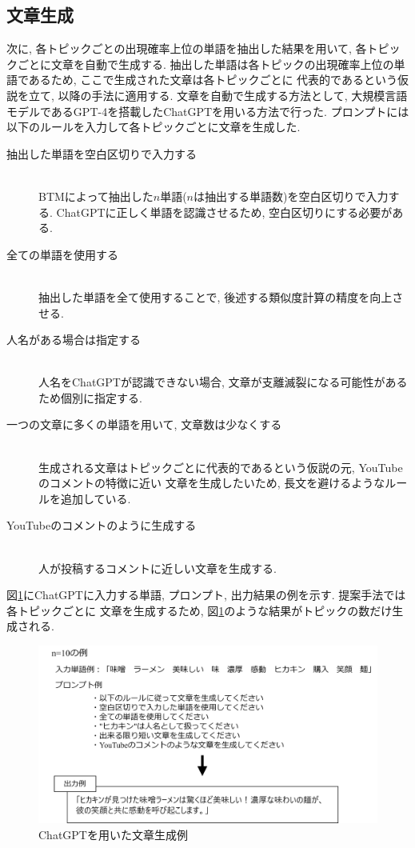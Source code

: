 \documentclass{ltjarticle}
\begin{document}
\subsection{文章生成}
次に, 各トピックごとの出現確率上位の単語を抽出した結果を用いて, 各トピックごとに文章を自動で生成する. 
抽出した単語は各トピックの出現確率上位の単語であるため, ここで生成された文章は各トピックごとに
代表的であるという仮説を立て, 以降の手法に適用する. 
文章を自動で生成する方法として, 大規模言語モデルであるGPT-4を搭載したChatGPTを用いる方法で行った. 
プロンプトには以下のルールを入力して各トピックごとに文章を生成した. 
\begin{description}
    \item[抽出した単語を空白区切りで入力する]\mbox{}\\
    BTMによって抽出した$n$単語($n$は抽出する単語数)を空白区切りで入力する. ChatGPTに正しく単語を認識させるため, 
    空白区切りにする必要がある. 
    \item[全ての単語を使用する] \mbox{}\\
    抽出した単語を全て使用することで, 後述する類似度計算の精度を向上させる.  
    \item[人名がある場合は指定する]\mbox{}\\
    人名をChatGPTが認識できない場合, 文章が支離滅裂になる可能性があるため個別に指定する. 
    \item[一つの文章に多くの単語を用いて, 文章数は少なくする]\mbox{}\\  
    生成される文章はトピックごとに代表的であるという仮説の元, YouTubeのコメントの特徴に近い
    文章を生成したいため, 長文を避けるようなルールを追加している. 
    \item[YouTubeのコメントのように生成する]\mbox{}\\
    人が投稿するコメントに近しい文章を生成する. 
\end{description}
\vspace{20truept}

図\ref{fig:文章生成}にChatGPTに入力する単語, プロンプト, 出力結果の例を示す. 提案手法では各トピックごとに
文章を生成するため, 図\ref{fig:文章生成}のような結果がトピックの数だけ生成される. 
\begin{figure}[h]
    \centering
    \includegraphics[width = 14.6cm]{images/文章生成.drawio.png}
    \caption{ChatGPTを用いた文章生成例}
    \label{fig:文章生成}
\end{figure}
\end{document}
